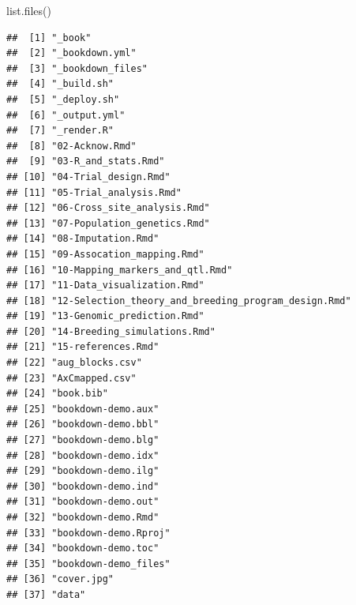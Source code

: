 \documentclass[
]{book}
\newenvironment{Shaded}{\begin{snugshade}}{\end{snugshade}}
\newcommand{\FunctionTok}[1]{\textcolor[rgb]{0.00,0.00,0.00}{#1}}
\newcommand{\NormalTok}[1]{#1}
\begin{document}
\begin{Shaded}
\begin{Highlighting}[]
\FunctionTok{list.files}\NormalTok{()}
\end{Highlighting}
\end{Shaded}

\begin{verbatim}
##  [1] "_book"                                              
##  [2] "_bookdown.yml"                                      
##  [3] "_bookdown_files"                                    
##  [4] "_build.sh"                                          
##  [5] "_deploy.sh"                                         
##  [6] "_output.yml"                                        
##  [7] "_render.R"                                          
##  [8] "02-Acknow.Rmd"                                      
##  [9] "03-R_and_stats.Rmd"                                 
## [10] "04-Trial_design.Rmd"                                
## [11] "05-Trial_analysis.Rmd"                              
## [12] "06-Cross_site_analysis.Rmd"                         
## [13] "07-Population_genetics.Rmd"                         
## [14] "08-Imputation.Rmd"                                  
## [15] "09-Assocation_mapping.Rmd"                          
## [16] "10-Mapping_markers_and_qtl.Rmd"                     
## [17] "11-Data_visualization.Rmd"                          
## [18] "12-Selection_theory_and_breeding_program_design.Rmd"
## [19] "13-Genomic_prediction.Rmd"                          
## [20] "14-Breeding_simulations.Rmd"                        
## [21] "15-references.Rmd"                                  
## [22] "aug_blocks.csv"                                     
## [23] "AxCmapped.csv"                                      
## [24] "book.bib"                                           
## [25] "bookdown-demo.aux"                                  
## [26] "bookdown-demo.bbl"                                  
## [27] "bookdown-demo.blg"                                  
## [28] "bookdown-demo.idx"                                  
## [29] "bookdown-demo.ilg"                                  
## [30] "bookdown-demo.ind"                                  
## [31] "bookdown-demo.out"                                  
## [32] "bookdown-demo.Rmd"                                  
## [33] "bookdown-demo.Rproj"                                
## [34] "bookdown-demo.toc"                                  
## [35] "bookdown-demo_files"                                
## [36] "cover.jpg"                                          
## [37] "data"                                               

\end{verbatim}
\end{document}
